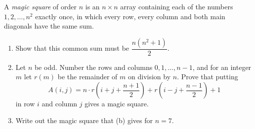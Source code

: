 A \emph{magic square} of order $n$ is an $n\times n$ array containing each of the numbers $1,2,\dots,n^2$ exactly once, in which every row, every column and both main diagonals have the same sum.
\begin{enumerate}
\item[(a)] Show that this common sum must be $\dfrac{n\left(n^2+1\right)}{2}$.
\item[(b)] Let $n$ be odd. Number the rows and columns $0,1,\dots,n-1$, and for an integer $m$ let $r(m)$ be the remainder of $m$ on division by $n$. Prove that putting
\[A(i,j)=n\cdot r\!\left(i+j+\dfrac{n+1}{2}\right)+r\!\left(i-j+\dfrac{n-1}{2}\right)+1\]
in row $i$ and column $j$ gives a magic square.
\item[(c)] Write out the magic square that (b) gives for $n=7$.
\end{enumerate}
